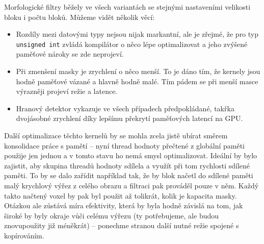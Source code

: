     Morfologické filtry běžely ve všech variantách se stejnými nastaveními velikosti bloku i počtu bloků. Můžeme vidět několik věcí:
    \begin{itemize}
      \item Rozdíly mezi datovými typy nejsou nijak markantní, ale je zřejmé, že pro typ {\tt unsigned int} zvládá kompilátor o něco lépe optimalizovat a jeho zvýšené paměťové nároky se zde neprojeví.
      \item Při zmenšení masky je zrychlení o něco menší. To je dáno tím, že kernely jsou hodně paměťové vázané a hlavně hodně malé. Tím pádem se při menší masce výrazněji projeví režie a latence.
      \item Hranový detektor vykazuje ve všech případech předpokládané, takřka dvojásobné zrychlení díky lepšímu překrytí paměťových latencí na GPU.
    \end{itemize}

    Další optimalizace těchto kernelů by se mohla zcela jistě ubírat směrem konsolidace práce s pamětí -- nyní thread hodnoty přečtené z globální paměti použije jen jednou a v tomto stavu ho nemá smysl optimalizovat. Ideální by bylo zajistit, aby skupina threadů hodnoty sdílela a využít při tom rychlosti sdílené paměti. To by se dalo zařídit například tak, že by blok načetl do sdílené paměti malý krychlový výřez z celého obrazu a filtraci pak prováděl pouze v něm. Každý takto načtený voxel by pak byl použit až tolikrát, kolik je kapacita masky. Otázkou ale zůstává míra efektivity, která by byla hodně závislá na tom, jak široké by byly okraje vůči celému výřezu (ty potřebujeme, ale budou znovupoužity již méněkrát) -- ponechme stranou další nutné režie spojené s kopírováním.

